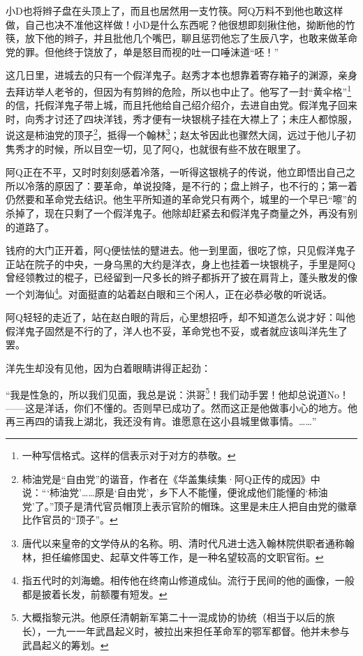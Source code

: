 \documentclass[12pt,UTF8]{ctexbook}
\begin{document}
小D也将辫子盘在头顶上了，而且也居然用一支竹筷。阿Q万料不到他也敢这样做，自己也决不准他这样做！小D是什么东西呢？他很想即刻揪住他，拗断他的竹筷，放下他的辫子，并且批他几个嘴巴，聊且惩罚他忘了生辰八字，也敢来做革命党的罪。但他终于饶放了，单是怒目而视的吐一口唾沫道“呸！”

这几日里，进城去的只有一个假洋鬼子。赵秀才本也想靠着寄存箱子的渊源，亲身去拜访举人老爷的，但因为有剪辫的危险，所以也中止了。他写了一封“黄伞格”\footnote{一种写信格式。这样的信表示对于对方的恭敬。}的信，托假洋鬼子带上城，而且托他给自己绍介绍介，去进自由党。假洋鬼子回来时，向秀才讨还了四块洋钱，秀才便有一块银桃子挂在大襟上了；未庄人都惊服，说这是柿油党的顶子\footnote{柿油党是“自由党”的谐音，作者在《华盖集续集·阿Q正传的成因》中说：“‘柿油党’……原是‘自由党’，乡下人不能懂，便讹成他们能懂的‘柿油党’了。”顶子是清代官员帽顶上表示官阶的帽珠。这里是未庄人把自由党的徽章比作官员的“顶子”。}，抵得一个翰林\footnote{唐代以来皇帝的文学侍从的名称。明、清时代凡进士选入翰林院供职者通称翰林，担任编修国史、起草文件等工作，是一种名望较高的文职官衔。}；赵太爷因此也骤然大阔，远过于他儿子初隽秀才的时候，所以目空一切，见了阿Q，也就很有些不放在眼里了。

阿Q正在不平，又时时刻刻感着冷落，一听得这银桃子的传说，他立即悟出自己之所以冷落的原因了：要革命，单说投降，是不行的；盘上辫子，也不行的；第一着仍然要和革命党去结识。他生平所知道的革命党只有两个，城里的一个早已“嚓”的杀掉了，现在只剩了一个假洋鬼子。他除却赶紧去和假洋鬼子商量之外，再没有别的道路了。

钱府的大门正开着，阿Q便怯怯的躄进去。他一到里面，很吃了惊，只见假洋鬼子正站在院子的中央，一身乌黑的大约是洋衣，身上也挂着一块银桃子，手里是阿Q曾经领教过的棍子，已经留到一尺多长的辫子都拆开了披在肩背上，蓬头散发的像一个刘海仙\footnote{指五代时的刘海蟾。相传他在终南山修道成仙。流行于民间的他的画像，一般都是披着长发，前额覆有短发。}。对面挺直的站着赵白眼和三个闲人，正在必恭必敬的听说话。

阿Q轻轻的走近了，站在赵白眼的背后，心里想招呼，却不知道怎么说才好：叫他假洋鬼子固然是不行的了，洋人也不妥，革命党也不妥，或者就应该叫洋先生了罢。

洋先生却没有见他，因为白着眼睛讲得正起劲：

“我是性急的，所以我们见面，我总是说：洪哥\footnote{大概指黎元洪。他原任清朝新军第二十一混成协的协统（相当于以后的旅长），一九一一年武昌起义时，被拉出来担任革命军的鄂军都督。他并未参与武昌起义的筹划。}！我们动手罢！他却总说道No！——这是洋话，你们不懂的。否则早已成功了。然而这正是他做事小心的地方。他再三再四的请我上湖北，我还没有肯。谁愿意在这小县城里做事情。……”
\end{document}
